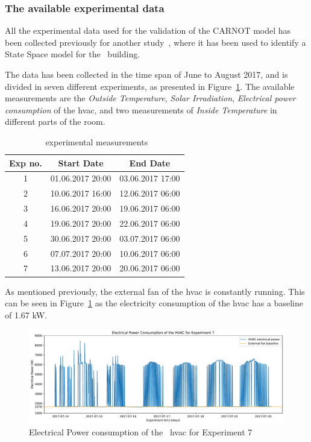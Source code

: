\subsubsection{The available experimental data}\label{sec:CARNOT_expdata}

All the experimental data used for the validation of the CARNOT model has been
collected previously for another
study~\cite{fabiettiMultitimeScaleCoordination2018}, where it has been used to
identify a State Space model for the \pdome\ building.

The data has been collected in the time span of June to August 2017, and is
divided in seven different experiments, as presented in
Figure~\ref{tab:exp_dates}. The available measurements are the \textit{Outside
Temperature}, \textit{Solar Irradiation}, \textit{Electrical power consumption}
of the \acrshort{hvac}, and two measurements of \textit{Inside Temperature} in
different parts of the room.

\begin{table}[ht]
\centering
    \begin{tabular}{||c c c||}
        \hline
        Exp no. & Start Date & End Date\\
        \hline \hline
        1 & 01.06.2017 20:00 & 03.06.2017 17:00 \\
        2 & 10.06.2017 16:00 & 12.06.2017 06:00 \\
        3 & 16.06.2017 20:00 & 19.06.2017 06:00 \\
        4 & 19.06.2017 20:00 & 22.06.2017 06:00 \\
        5 & 30.06.2017 20:00 & 03.07.2017 06:00 \\
        6 & 07.07.2017 20:00 & 10.06.2017 06:00 \\
        7 & 13.06.2017 20:00 & 20.06.2017 06:00 \\
        \hline
    \end{tabular}
\caption{\pdome\ experimental measurements}
\label{tab:exp_dates}
\end{table}

\clearpage

As mentioned previously, the external fan of the \acrshort{hvac} is constantly
running.  This can be seen in Figure~\ref{fig:Polydome_electricity} as the
electricity consumption of the \acrshort{hvac} has a baseline of 1.67 kW.

\begin{figure}[ht]
    \centering
    \includegraphics[width = \textwidth]{Plots/Fan_baseline.pdf}
    \caption{Electrical Power consumption of the \pdome\ \acrshort{hvac} for Experiment 7}
    \label{fig:Polydome_electricity}
\end{figure}

